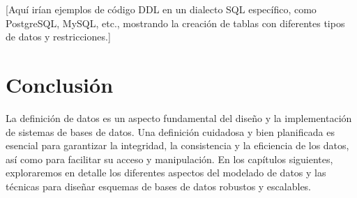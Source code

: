 [Aquí irían ejemplos de código DDL en un dialecto SQL específico, como PostgreSQL, MySQL, etc., mostrando la creación de tablas con diferentes tipos de datos y restricciones.]

\section{Conclusión}

La definición de datos es un aspecto fundamental del diseño y la implementación de sistemas de bases de datos.  Una definición cuidadosa y bien planificada es esencial para garantizar la integridad, la consistencia y la eficiencia de los datos, así como para facilitar su acceso y manipulación.  En los capítulos siguientes, exploraremos en detalle los diferentes aspectos del modelado de datos y las técnicas para diseñar esquemas de bases de datos robustos y escalables.
